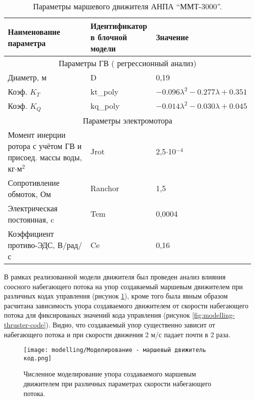 \begin{table}
    \caption{Параметры маршевого движителя АНПА ``ММТ-3000''.}
    \label{tab:modelling-thruster}
    \centering
    \begin{tabular}{lll}
        \toprule
        \makecell[l]{Наименование \\ параметра} & \makecell[l]{Идентификатор \\ в блочной модели} & Значение \\
        \midrule
        \multicolumn{3}{c}{Параметры ГВ ( регрессионный анализ)} \\
        \midrule
        Диаметр, м  & D & 0,19\\
        Коэф. $K_T$ & kt\_poly & $-0.096\lambda^2 -0.277\lambda + 0.351$\\
        Коэф. $K_Q$ & kq\_poly & $-0.014\lambda^2 -0.030\lambda + 0.045$\\
        \midrule
        \multicolumn{3}{c}{Параметры электромотора} \\
        \midrule
        \makecell[l]{Момент инерции ротора \\
        с учётом ГВ и присоед. \\ массы воды, кг$\cdot$м$^2$} & Jrot & 2,5$\cdot$10$^{-4}$ \\
        Сопротивление обмоток, Ом & Ranchor & 1,5 \\
        Электрическая постоянная, c & Tem & 0,0004 \\
        \makecell[l]{Коэффициент \\ 
        противо-ЭДС, В/рад/с} & Ce & 0,16 \\
        \bottomrule
    \end{tabular}
\end{table}

В рамках реализованной модели движителя был проведен анализ влияния соосного набегающего потока на упор создаваемый маршевым движителем при различных кодах управления (рисунок \ref{fig:modelling-thruster-velocity}), кроме того была явным образом расчитана зависимость упора создаваемого движителем от скорости набегающего потока для фиксированых значений кода управления (рисунок \ref{fig:modelling-thruster-code}).
Видно, что создаваемый упор существенно зависит от набегающего потока и при скорости движения 2 м/с падает почти в 2 раза.

\begin{figure}[ht]
    \centering
    \texttt{[image: modelling/Моделирование - маршевый движитель код.png]}
    \caption{Численное моделирование упора создаваемого маршевым движителем при различных параметрах скорости набегающего потока.}
    \label{fig:modelling-thruster-velocity}
\end{figure}

